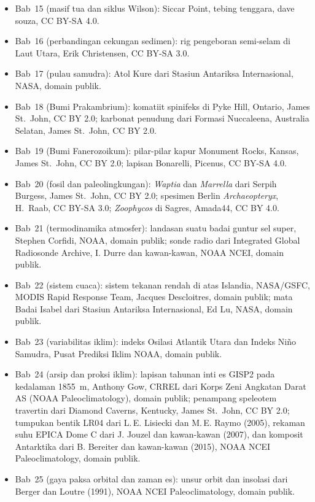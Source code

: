 \begin{itemize}
  \item Bab~15 (masif tua dan siklus Wilson): Siccar Point, tebing tenggara, dave souza, CC BY-SA 4.0.
  \item Bab~16 (perbandingan cekungan sedimen): rig pengeboran semi-selam di Laut Utara, Erik Christensen, CC BY-SA 3.0.
  \item Bab~17 (pulau samudra): Atol Kure dari Stasiun Antariksa Internasional, NASA, domain publik.
  \item Bab~18 (Bumi Prakambrium): komatiit spinifeks di Pyke Hill, Ontario, James St.~John, CC BY 2.0; karbonat penudung dari Formasi Nuccaleena, Australia Selatan, James St.~John, CC BY 2.0.
  \item Bab~19 (Bumi Fanerozoikum): pilar-pilar kapur Monument Rocks, Kansas, James St.~John, CC BY 2.0; lapisan Bonarelli, Picenus, CC BY-SA 4.0.
  \item Bab~20 (fosil dan paleolingkungan): \emph{Waptia} dan \emph{Marrella} dari Serpih Burgess, James St.~John, CC BY 2.0; spesimen Berlin \emph{Archaeopteryx}, H.~Raab, CC BY-SA 3.0; \emph{Zoophycos} di Sagres, Amada44, CC BY 4.0.
  \item Bab~21 (termodinamika atmosfer): landasan suatu badai guntur sel super, Stephen Corfidi, NOAA, domain publik; sonde radio dari Integrated Global Radiosonde Archive, I. Durre dan kawan-kawan, NOAA NCEI, domain publik.
  \item Bab~22 (sistem cuaca): sistem tekanan rendah di atas Islandia, NASA/GSFC, MODIS Rapid Response Team, Jacques Descloitres, domain publik; mata Badai Isabel dari Stasiun Antariksa Internasional, Ed Lu, NASA, domain publik.
  \item Bab~23 (variabilitas iklim): indeks Osilasi Atlantik Utara dan Indeks Niño Samudra, Pusat Prediksi Iklim NOAA, domain publik.
  \item Bab~24 (arsip dan proksi iklim): lapisan tahunan inti es GISP2 pada kedalaman 1855~m, Anthony Gow, CRREL dari Korps Zeni Angkatan Darat AS (NOAA Paleoclimatology), domain publik; penampang speleotem travertin dari Diamond Caverns, Kentucky, James St.~John, CC BY 2.0; tumpukan bentik LR04 dari L.\,E. Lisiecki dan M.\,E. Raymo (2005), rekaman suhu EPICA Dome C dari J. Jouzel dan kawan-kawan (2007), dan komposit  Antarktika dari B. Bereiter dan kawan-kawan (2015), NOAA NCEI Paleoclimatology, domain publik.
  \item Bab~25 (gaya paksa orbital dan zaman es): unsur orbit dan insolasi dari Berger dan Loutre (1991), NOAA NCEI Paleoclimatology, domain publik.

\end{itemize}
